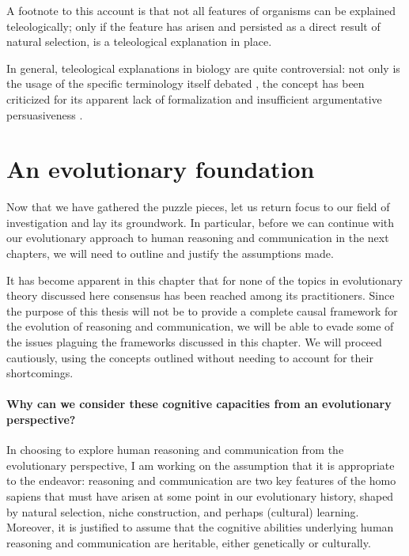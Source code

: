 A footnote to this account is that not all features of organisms can be explained teleologically; only if the feature has arisen and persisted as a direct result of natural selection, is a teleological explanation in place.

In general, teleological explanations in biology are quite controversial: not only is the usage of the specific terminology itself debated \citep[p.~27 and references therein]{Ayala99}, the concept has been criticized for its apparent lack of formalization and insufficient argumentative persuasiveness \citep[p.~83]{Baedke2021}.

\section{An evolutionary foundation}
Now that we have gathered the puzzle pieces, let us return focus to our field of investigation and lay its groundwork. In particular, before we can continue with our evolutionary approach to human reasoning and communication in the next chapters, we will need to outline and justify the assumptions made.

It has become apparent in this chapter that for none of the topics in evolutionary theory discussed here consensus has been reached among its practitioners. Since the purpose of this thesis will not be to provide a complete causal framework for the evolution of reasoning and communication, we will be able to evade some of the issues plaguing the frameworks discussed in this chapter. We will proceed cautiously, using the concepts outlined without needing to account for their shortcomings.

\paragraph{Why can we consider these cognitive capacities from an evolutionary perspective?}

In choosing to explore human reasoning and communication from the evolutionary perspective, I am working on the assumption that it is appropriate to the endeavor: reasoning and communication are two key features of the homo sapiens that must have arisen at some point in our evolutionary history, shaped by natural selection, niche construction, and perhaps (cultural) learning. Moreover, it is justified to assume that the cognitive abilities underlying human reasoning and communication are heritable, either genetically or culturally.

